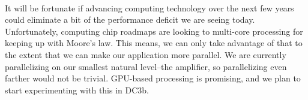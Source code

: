 \paragraph{} It will be fortunate if advancing computing technology
over the next 
few years could eliminate a bit of the performance deficit we are seeing
today.  Unfortunately, computing chip roadmaps are looking to
multi-core processing for keeping up with Moore's law.  This means, we
can only take advantage of that to the extent that we can make our
application more parallel.  We are currently parallelizing on our
smallest natural level--the amplifier, so parallelizing even farther
would not be trivial.  GPU-based processing is promising, and we plan
to start experimenting with this in DC3b. 





